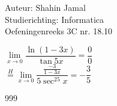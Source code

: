 \documentclass[a4paper]{article}
\begin{document}
  
\noindent \large Auteur: Shahin Jamal \\
\noindent \large Studierichting: Informatica\\
\noindent \large Oefeningenreeks 3C nr. 18.10\\

\medskip

\normalsize

$\lim\limits_{x \rightarrow 0}\dfrac{\ln(1 - 3x)}{\tan 5x} = \dfrac{0}{0}$\\

$\overset{H}{=} \lim\limits_{x \rightarrow 0}\dfrac{\tfrac{-3}{1-3x}}{5\sec^25x} = -\dfrac{3}{5}$\\

\begin{thebibliography}{999}
\end{thebibliography}
\end{document}
